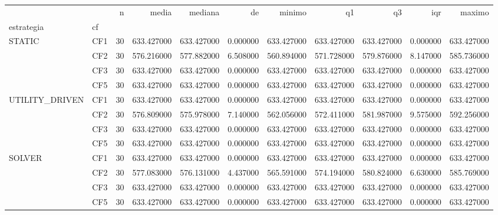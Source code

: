 \begin{tabular}{llrrrrrrrrr}
\toprule
 &  & n & media & mediana & de & minimo & q1 & q3 & iqr & maximo \\
estrategia & cf &  &  &  &  &  &  &  &  &  \\
\midrule
\multirow[t]{4}{*}{STATIC} & CF1 & 30 & 633.427000 & 633.427000 & 0.000000 & 633.427000 & 633.427000 & 633.427000 & 0.000000 & 633.427000 \\
 & CF2 & 30 & 576.216000 & 577.882000 & 6.508000 & 560.894000 & 571.728000 & 579.876000 & 8.147000 & 585.736000 \\
 & CF3 & 30 & 633.427000 & 633.427000 & 0.000000 & 633.427000 & 633.427000 & 633.427000 & 0.000000 & 633.427000 \\
 & CF5 & 30 & 633.427000 & 633.427000 & 0.000000 & 633.427000 & 633.427000 & 633.427000 & 0.000000 & 633.427000 \\
\cline{1-11}
\multirow[t]{4}{*}{UTILITY_DRIVEN} & CF1 & 30 & 633.427000 & 633.427000 & 0.000000 & 633.427000 & 633.427000 & 633.427000 & 0.000000 & 633.427000 \\
 & CF2 & 30 & 576.809000 & 575.978000 & 7.140000 & 562.056000 & 572.411000 & 581.987000 & 9.575000 & 592.256000 \\
 & CF3 & 30 & 633.427000 & 633.427000 & 0.000000 & 633.427000 & 633.427000 & 633.427000 & 0.000000 & 633.427000 \\
 & CF5 & 30 & 633.427000 & 633.427000 & 0.000000 & 633.427000 & 633.427000 & 633.427000 & 0.000000 & 633.427000 \\
\cline{1-11}
\multirow[t]{4}{*}{SOLVER} & CF1 & 30 & 633.427000 & 633.427000 & 0.000000 & 633.427000 & 633.427000 & 633.427000 & 0.000000 & 633.427000 \\
 & CF2 & 30 & 577.083000 & 576.131000 & 4.437000 & 565.591000 & 574.194000 & 580.824000 & 6.630000 & 585.769000 \\
 & CF3 & 30 & 633.427000 & 633.427000 & 0.000000 & 633.427000 & 633.427000 & 633.427000 & 0.000000 & 633.427000 \\
 & CF5 & 30 & 633.427000 & 633.427000 & 0.000000 & 633.427000 & 633.427000 & 633.427000 & 0.000000 & 633.427000 \\
\cline{1-11}
\bottomrule
\end{tabular}
